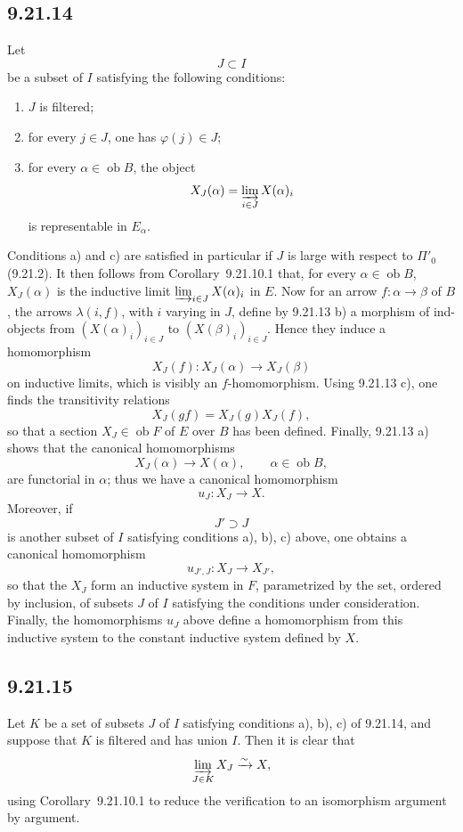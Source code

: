\documentclass[11pt]{article}
\newcommand{\ob}{\operatorname{ob}}
\begin{document}
\subsection*{9.21.14}

Let
\[
 J\subset I
\]
be a subset of $I$ satisfying the following conditions:
\begin{enumerate}[label=\alph*)]
\item $J$ is filtered;
\item for every $j\in J$, one has $\varphi(j)\in J$;
\item for every $\alpha\in\ob B$, the object
\[
 X_J(\alpha)=\varinjlim_{i\in J}X(\alpha)_i
\]
is representable in $E_\alpha$.
\end{enumerate}
Conditions a) and c) are satisfied in particular if $J$ is large with respect to $\Pi'_0$ (9.21.2). It then follows from Corollary~9.21.10.1 that, for every $\alpha\in\ob B$, $X_J(\alpha)$ is the inductive limit $\varinjlim_{i\in J}X(\alpha)_i$ in $E$. Now for an arrow $f:\alpha\to\beta$ of $B$, the arrows $\lambda(i,f)$, with $i$ varying in $J$, define by 9.21.13 b) a morphism of ind-objects from $(X(\alpha)_i)_{i\in J}$ to $(X(\beta)_i)_{i\in J}$. Hence they induce a homomorphism
\[
 X_J(f):X_J(\alpha)\longrightarrow X_J(\beta)
\]
on inductive limits, which is visibly an $f$-homomorphism. Using 9.21.13 c), one finds the transitivity relations
\[
 X_J(gf)=X_J(g)X_J(f),
\]
so that a section $X_J\in\ob F$ of $E$ over $B$ has been defined. Finally, 9.21.13 a) shows that the canonical homomorphisms
\[
 X_J(\alpha)\longrightarrow X(\alpha),\qquad \alpha\in\ob B,
\]
are functorial in $\alpha$; thus we have a canonical homomorphism
\[
 u_J:X_J\longrightarrow X.
\]
Moreover, if
\[
 J'\supset J
\]
is another subset of $I$ satisfying conditions a), b), c) above, one obtains a canonical homomorphism
\[
 u_{J',J}:X_J\longrightarrow X_{J'},
\]
so that the $X_J$ form an inductive system in $F$, parametrized by the set, ordered by inclusion, of subsets $J$ of $I$ satisfying the conditions under consideration. Finally, the homomorphisms $u_J$ above define a homomorphism from this inductive system to the constant inductive system defined by $X$.

\subsection*{9.21.15}

Let $K$ be a set of subsets $J$ of $I$ satisfying conditions a), b), c) of 9.21.14, and suppose that $K$ is filtered and has union $I$. Then it is clear that
\[
 \varinjlim_{J\in K}X_J\xrightarrow{\sim}X,
\]
using Corollary~9.21.10.1 to reduce the verification to an isomorphism argument by argument.
\end{document}
